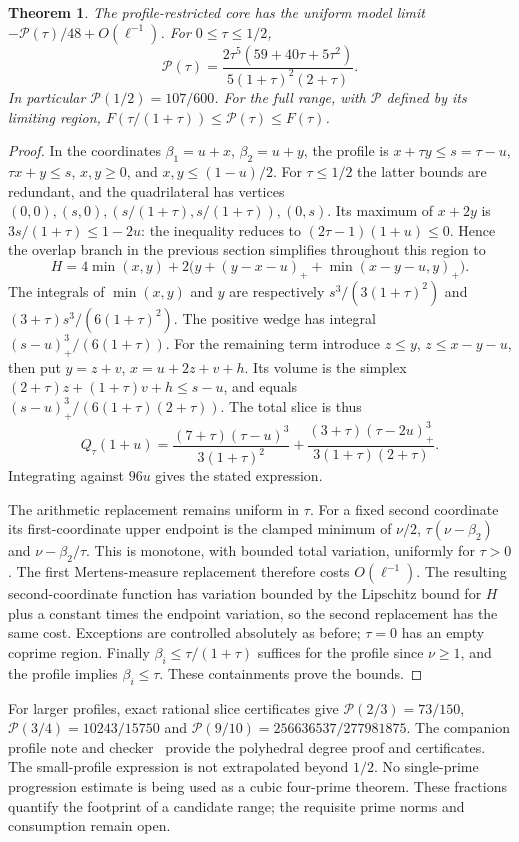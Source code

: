 \documentclass[11pt]{article}
\newtheorem{theorem}{Theorem}
\begin{document}
\begin{theorem}\label{thm:profile}
The profile-restricted core has the uniform model limit
$-\mathcal P(\tau)/48+O(\ell^{-1})$. For $0\leq\tau\leq1/2$,
\[
 \mathcal P(\tau)=
 \frac{2\tau^5(59+40\tau+5\tau^2)}{5(1+\tau)^2(2+\tau)}.
\]
In particular $\mathcal P(1/2)=107/600$.
For the full range, with $\mathcal P$ defined by its limiting region,
$F(\tau/(1+\tau))\leq\mathcal P(\tau)\leq F(\tau)$.
\end{theorem}
\begin{proof}
In the coordinates $\beta_1=u+x$, $\beta_2=u+y$, the profile is
$x+\tau y\leq s=\tau-u$, $\tau x+y\leq s$, $x,y\geq0$,
and $x,y\leq(1-u)/2$. For $\tau\leq1/2$ the latter bounds are redundant,
and the quadrilateral has vertices
$(0,0),(s,0),(s/(1+\tau),s/(1+\tau)),(0,s)$.
Its maximum of $x+2y$ is $3s/(1+\tau)\leq1-2u$:
the inequality reduces to $(2\tau-1)(1+u)\leq0$.
Hence the overlap branch in the previous section simplifies throughout
this region to
\[
 H=4\min(x,y)+2\bigl(y+(y-x-u)_++\min(x-y-u,y)_+\bigr).
\]
The integrals of $\min(x,y)$ and $y$ are respectively
$s^3/(3(1+\tau)^2)$ and $(3+\tau)s^3/(6(1+\tau)^2)$.
The positive wedge has integral $(s-u)_+^3/(6(1+\tau))$.
For the remaining term introduce $z\leq y$, $z\leq x-y-u$,
then put $y=z+v$, $x=u+2z+v+h$.
Its volume is the simplex
$(2+\tau)z+(1+\tau)v+h\leq s-u$, and equals
$(s-u)_+^3/(6(1+\tau)(2+\tau))$.
The total slice is thus
\[
 Q_\tau(1+u)=\frac{(7+\tau)(\tau-u)^3}{3(1+\tau)^2}
 +\frac{(3+\tau)(\tau-2u)_+^3}{3(1+\tau)(2+\tau)}.
\]
Integrating against $96u$ gives the stated expression.

The arithmetic replacement remains uniform in $\tau$.
For a fixed second coordinate its first-coordinate upper endpoint is
the clamped minimum of $\nu/2$, $\tau(\nu-\beta_2)$ and
$\nu-\beta_2/\tau$. This is monotone, with bounded total variation,
uniformly for $\tau>0$. The first Mertens-measure replacement therefore
costs $O(\ell^{-1})$. The resulting second-coordinate function has
variation bounded by the Lipschitz bound for $H$ plus a constant times
the endpoint variation, so the second replacement has the same cost.
Exceptions are controlled absolutely as before; $\tau=0$ has an empty
coprime region. Finally $\beta_i\leq\tau/(1+\tau)$ suffices for the
profile since $\nu\geq1$, and the profile implies $\beta_i\leq\tau$.
These containments prove the bounds.
\end{proof}

For larger profiles, exact rational slice certificates give
$\mathcal P(2/3)=73/150$, $\mathcal P(3/4)=10243/15750$ and
$\mathcal P(9/10)=256636537/277981875$.
The companion profile note and checker~\cite{profile} provide the
polyhedral degree proof and certificates. The small-profile expression
is not extrapolated beyond $1/2$.
No single-prime progression estimate is being used as a cubic
four-prime theorem. These fractions quantify the footprint of a
candidate range; the requisite prime norms and consumption remain open.
\end{document}
